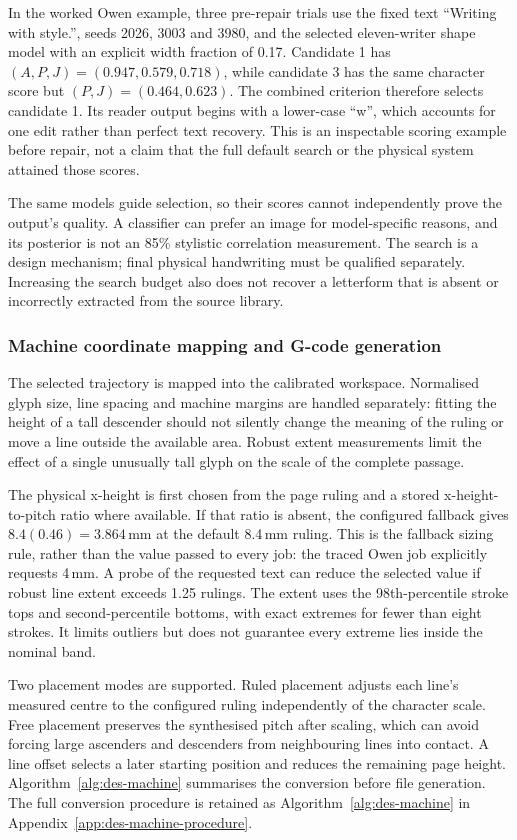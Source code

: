 In the worked Owen example, three pre-repair trials use the fixed text ``Writing with style.'', seeds 2026, 3003 and 3980, and the selected eleven-writer shape model with an explicit width fraction of 0.17. Candidate 1 has $(A,P,J)=(0.947,0.579,0.718)$, while candidate 3 has the same character score but $(P,J)=(0.464,0.623)$. The combined criterion therefore selects candidate 1. Its reader output begins with a lower-case ``w'', which accounts for one edit rather than perfect text recovery. This is an inspectable scoring example before repair, not a claim that the full default search or the physical system attained those scores.

The same models guide selection, so their scores cannot independently prove the output's quality. A classifier can prefer an image for model-specific reasons, and its posterior is not an 85\% stylistic correlation measurement. The search is a design mechanism; final physical handwriting must be qualified separately. Increasing the search budget also does not recover a letterform that is absent or incorrectly extracted from the source library.

\subsubsection{Machine coordinate mapping and G-code generation}
\label{sec:des-gcode}
The selected trajectory is mapped into the calibrated workspace. Normalised glyph size, line spacing and machine margins are handled separately: fitting the height of a tall descender should not silently change the meaning of the ruling or move a line outside the available area. Robust extent measurements limit the effect of a single unusually tall glyph on the scale of the complete passage.


The physical x-height is first chosen from the page ruling and a stored x-height-to-pitch ratio where available. If that ratio is absent, the configured fallback gives $8.4(0.46)=3.864$\,mm at the default 8.4\,mm ruling. This is the fallback sizing rule, rather than the value passed to every job: the traced Owen job explicitly requests 4\,mm. A probe of the requested text can reduce the selected value if robust line extent exceeds 1.25 rulings. The extent uses the 98th-percentile stroke tops and second-percentile bottoms, with exact extremes for fewer than eight strokes. It limits outliers but does not guarantee every extreme lies inside the nominal band.

Two placement modes are supported. Ruled placement adjusts each line's measured centre to the configured ruling independently of the character scale. Free placement preserves the synthesised pitch after scaling, which can avoid forcing large ascenders and descenders from neighbouring lines into contact. A line offset selects a later starting position and reduces the remaining page height. Algorithm~\ref{alg:des-machine} summarises the conversion before file generation.
The full conversion procedure is retained as Algorithm~\ref{alg:des-machine} in Appendix~\ref{app:des-machine-procedure}.


